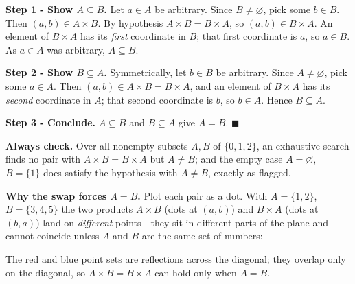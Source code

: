 \documentclass[11pt,a4paper]{article}
\begin{document}
\textbf{Step 1 - Show $A\subseteq B$.}
Let $a\in A$ be arbitrary. Since $B\neq\varnothing$, pick some $b\in B$. Then
$(a,b)\in A\times B$. By hypothesis $A\times B=B\times A$, so $(a,b)\in B\times A$. An element of
$B\times A$ has its \emph{first} coordinate in $B$; that first coordinate is $a$, so $a\in B$.
As $a\in A$ was arbitrary, $A\subseteq B$.

\textbf{Step 2 - Show $B\subseteq A$.}
Symmetrically, let $b\in B$ be arbitrary. Since $A\neq\varnothing$, pick some $a\in A$. Then
$(a,b)\in A\times B=B\times A$, and an element of $B\times A$ has its \emph{second} coordinate in
$A$; that second coordinate is $b$, so $b\in A$. Hence $B\subseteq A$.

\textbf{Step 3 - Conclude.}
$A\subseteq B$ and $B\subseteq A$ give $A=B$. $\blacksquare$

\textbf{Always check.} Over all nonempty subsets $A,B$ of $\{0,1,2\}$, an exhaustive search finds
no pair with $A\times B=B\times A$ but $A\neq B$; and the empty case $A=\varnothing$, $B=\{1\}$ does
satisfy the hypothesis with $A\neq B$, exactly as flagged. \checkmark

\textbf{Why the swap forces $A=B$.} Plot each pair as a dot. With $A=\{1,2\}$, $B=\{3,4,5\}$ the two
products $A\times B$ (dots at $(a,b)$) and $B\times A$ (dots at $(b,a)$) land on \emph{different}
points - they sit in different parts of the plane and cannot coincide unless $A$ and $B$ are the
same set of numbers:

\begin{center}
\end{center}
The red and blue point sets are reflections across the diagonal; they overlap only on the diagonal,
so $A\times B=B\times A$ can hold only when $A=B$.
\end{document}
